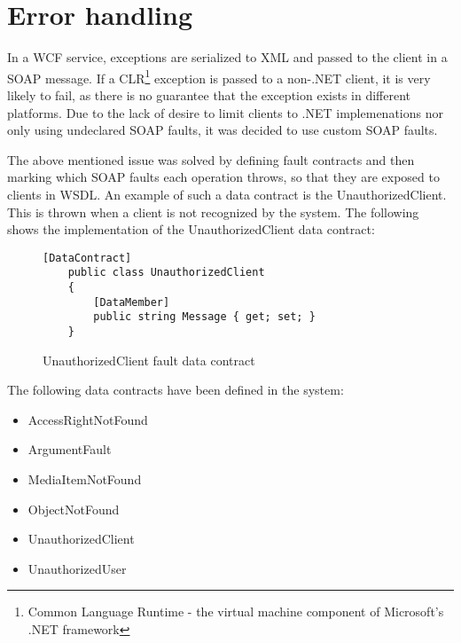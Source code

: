 \documentclass[../report.tex]{subfiles}
\begin{document}
\section{Error handling}
In a WCF service, exceptions are serialized to XML and passed to the client in a SOAP message. If a CLR\footnote{Common Language Runtime - the virtual machine component of Microsoft's .NET framework} exception is passed to a non-.NET client, it is very likely to fail, as there is no guarantee that the exception exists in different platforms. Due to the lack of desire to limit clients to .NET implemenations nor only using undeclared SOAP faults, it was decided to use custom SOAP faults.


The above mentioned issue was solved by defining fault contracts and then marking which SOAP faults each operation throws, so that they are exposed to clients in WSDL. An example of such a data contract is the UnauthorizedClient. This is thrown when a client is not recognized by the system. The following shows the implementation of the UnauthorizedClient data contract:


\begin{figure}[H]
\begin{lstlisting}[frame=single]
    [DataContract]
    public class UnauthorizedClient
    {
        [DataMember]
        public string Message { get; set; }
    }
\end{lstlisting}
\caption{UnauthorizedClient fault data contract}
\end{figure}

The following data contracts have been defined in the system:

\begin{itemize}
\item AccessRightNotFound
\item ArgumentFault
\item MediaItemNotFound
\item ObjectNotFound
\item UnauthorizedClient
\item UnauthorizedUser
\end{itemize}
\end{document}
